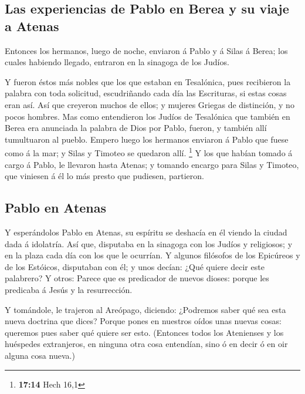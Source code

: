 \hypertarget{las-experiencias-de-pablo-en-berea-y-su-viaje-a-atenas}{%
\subsection{Las experiencias de Pablo en Berea y su viaje a
Atenas}\label{las-experiencias-de-pablo-en-berea-y-su-viaje-a-atenas}}

 Entonces los hermanos, luego de noche, enviaron á Pablo y
á Silas á Berea; los cuales habiendo llegado, entraron en la sinagoga de
los Judíos.

 Y fueron éstos más nobles que los que estaban en
Tesalónica, pues recibieron la palabra con toda solicitud, escudriñando
cada día las Escrituras, si estas cosas eran así.  Así que
creyeron muchos de ellos; y mujeres Griegas de distinción, y no pocos
hombres.  Mas como entendieron los Judíos de Tesalónica que
también en Berea era anunciada la palabra de Dios por Pablo, fueron, y
también allí tumultuaron al pueblo.  Empero luego los
hermanos enviaron á Pablo que fuese como á la mar; y Silas y Timoteo se
quedaron allí. \footnote{\textbf{17:14} Hech 16,1}  Y los
que habían tomado á cargo á Pablo, le llevaron hasta Atenas; y tomando
encargo para Silas y Timoteo, que viniesen á él lo más presto que
pudiesen, partieron.

\hypertarget{pablo-en-atenas}{%
\subsection{Pablo en Atenas}\label{pablo-en-atenas}}

 Y esperándolos Pablo en Atenas, su espíritu se deshacía en
él viendo la ciudad dada á idolatría.  Así que, disputaba
en la sinagoga con los Judíos y religiosos; y en la plaza cada día con
los que le ocurrían.  Y algunos filósofos de los Epicúreos
y de los Estóicos, disputaban con él; y unos decían: ¿Qué quiere decir
este palabrero? Y otros: Parece que es predicador de nuevos dioses:
porque les predicaba á Jesús y la resurrección.

 Y tomándole, le trajeron al Areópago, diciendo: ¿Podremos
saber qué sea esta nueva doctrina que dices?  Porque pones
en nuestros oídos unas nuevas cosas: queremos pues saber qué quiere ser
esto.  (Entonces todos los Atenienses y los huéspedes
extranjeros, en ninguna otra cosa entendían, sino ó en decir ó en oir
alguna cosa nueva.)

